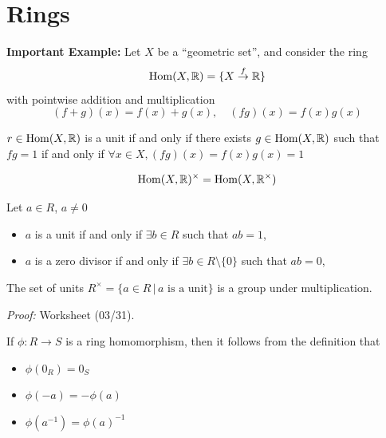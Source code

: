 \documentclass[12pt]{amsart}
\begin{document}


\section{Rings}

\textbf{Important Example:} Let $X$ be a ``geometric set'', and consider the ring $$\operatorname{Hom}(X, \mathbb R) = \{X \overset{f}{\to} \mathbb R\}$$ with pointwise addition and multiplication $$(f+g)(x) = f(x) + g(x), \quad (fg)(x) = f(x)g(x)$$
    
    $r \in \operatorname{Hom}(X, \mathbb R)$ is a unit if and only if there exists $g \in \operatorname{Hom}(X, \mathbb R)$ such that $fg = 1$ if and only if $\forall x \in X, (fg)(x) = f(x) g(x) = 1$
    
    $$\operatorname{Hom}(X, \mathbb R)^\times = \operatorname{Hom}(X, \mathbb R^\times)$$
    


\begin{definition}
     Let $a \in R$,  $a \neq 0$
    \begin{itemize}
        \item $a$ is a unit if and only if $\exists b \in R$ such that $ab = 1$, 
        \item $a$ is a zero divisor if and only if $\exists b \in R \setminus \{0\}$ such that $ab = 0$, 
    \end{itemize}
\end{definition}

\begin{lemma}
    The set of units $R^\times = \{a \in R \,| \, a \text{ is a unit}\}$ is a group under multiplication. 
    
    \textit{Proof:} Worksheet (03/31). 
\end{lemma}


\begin{lemma}
    If $\phi: R \to S$ is a ring homomorphism, then it follows from the definition that 
    \begin{itemize}
        \item $\phi(0_R) = 0_S$
        \item $\phi(-a) = -\phi(a)$
        \item $\phi(a^{-1}) = \phi(a)^{-1}$
    \end{itemize}
\end{lemma}
\end{document}
